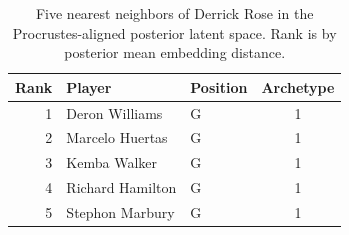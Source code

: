 \begin{table}[htbp]
  \centering\small
  \begin{tabular}{rllc}
    \toprule
    Rank & Player & Position & Archetype \\
    \midrule
    1 & Deron Williams & G & 1 \\
    2 & Marcelo Huertas & G & 1 \\
    3 & Kemba Walker & G & 1 \\
    4 & Richard Hamilton & G & 1 \\
    5 & Stephon Marbury & G & 1 \\
    \bottomrule
  \end{tabular}
  \caption{Five nearest neighbors of Derrick Rose in the Procrustes-aligned posterior latent space. Rank is by posterior mean embedding distance.}
  \label{tab:Derrick_Rose_neighbors}
\end{table}

